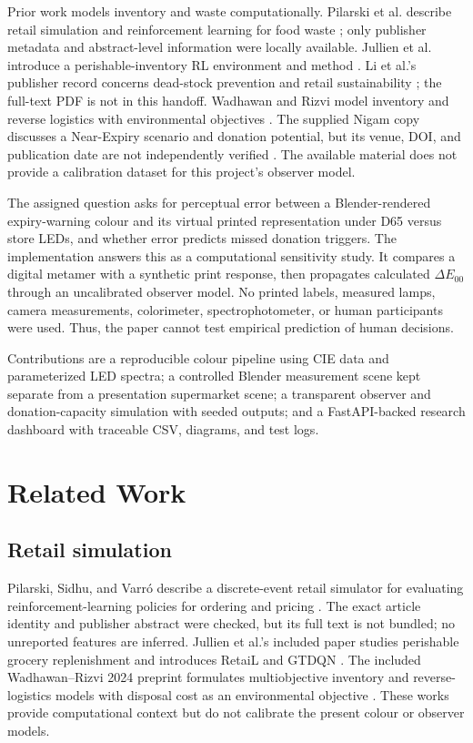 \documentclass[journal]{IEEEtran}
\newcommand{\dE}{\ensuremath{\Delta E_{00}}}
\begin{document}
Prior work models inventory and waste computationally. Pilarski et al. describe retail simulation and reinforcement learning for food waste \cite{pilarski}; only publisher metadata and abstract-level information were locally available. Jullien et al. introduce a perishable-inventory RL environment and method \cite{jullien}. Li et al.'s publisher record concerns dead-stock prevention and retail sustainability \cite{li}; the full-text PDF is not in this handoff. Wadhawan and Rizvi model inventory and reverse logistics with environmental objectives \cite{wadhawan}. The supplied Nigam copy discusses a Near-Expiry scenario and donation potential, but its venue, DOI, and publication date are not independently verified \cite{nigam}. The available material does not provide a calibration dataset for this project's observer model.

The assigned question asks for perceptual error between a Blender-rendered expiry-warning colour and its virtual printed representation under D65 versus store LEDs, and whether error predicts missed donation triggers. The implementation answers this as a computational sensitivity study. It compares a digital metamer with a synthetic print response, then propagates calculated \dE{} through an uncalibrated observer model. No printed labels, measured lamps, camera measurements, colorimeter, spectrophotometer, or human participants were used. Thus, the paper cannot test empirical prediction of human decisions.

Contributions are a reproducible colour pipeline using CIE data and parameterized LED spectra; a controlled Blender measurement scene kept separate from a presentation supermarket scene; a transparent observer and donation-capacity simulation with seeded outputs; and a FastAPI-backed research dashboard with traceable CSV, diagrams, and test logs.

\section{Related Work}
\subsection{Retail simulation}
Pilarski, Sidhu, and Varr\'o describe a discrete-event retail simulator for evaluating reinforcement-learning policies for ordering and pricing \cite{pilarski}. The exact article identity and publisher abstract were checked, but its full text is not bundled; no unreported features are inferred. Jullien et al.'s included paper studies perishable grocery replenishment and introduces RetaiL and GTDQN \cite{jullien}. The included Wadhawan--Rizvi 2024 preprint formulates multiobjective inventory and reverse-logistics models with disposal cost as an environmental objective \cite{wadhawan}. These works provide computational context but do not calibrate the present colour or observer models.
\end{document}
